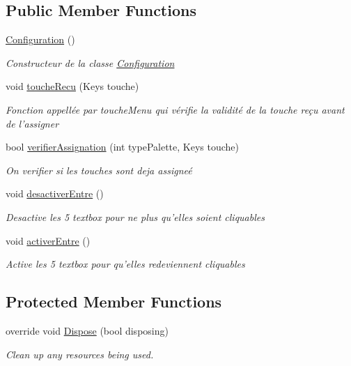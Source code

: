 \subsection*{Public Member Functions}
\begin{DoxyCompactItemize}
\item 
\hyperlink{class_interface_graphique_1_1_configuration_adb0bf51b9f3e30cfed923c7d9d950493}{Configuration} ()
\begin{DoxyCompactList}\small\item\em Constructeur de la classe \hyperlink{class_interface_graphique_1_1_configuration}{Configuration} \end{DoxyCompactList}\item 
void \hyperlink{class_interface_graphique_1_1_configuration_ab4745548932770c8563f537213665333}{touche\-Recu} (Keys touche)
\begin{DoxyCompactList}\small\item\em Fonction appellée par touche\-Menu qui vérifie la validité de la touche reçu avant de l'assigner \end{DoxyCompactList}\item 
bool \hyperlink{class_interface_graphique_1_1_configuration_ae446d3de8050f39b3a59c25cef3b0545}{verifier\-Assignation} (int type\-Palette, Keys touche)
\begin{DoxyCompactList}\small\item\em On verifier si les touches sont deja assigneé \end{DoxyCompactList}\item 
void \hyperlink{class_interface_graphique_1_1_configuration_a00f02e8ebc64ff4e6215fa4c84608fe3}{desactiver\-Entre} ()
\begin{DoxyCompactList}\small\item\em Desactive les 5 textbox pour ne plus qu'elles soient cliquables \end{DoxyCompactList}\item 
void \hyperlink{class_interface_graphique_1_1_configuration_aee709272d249a7f4d498befdc1f481ad}{activer\-Entre} ()
\begin{DoxyCompactList}\small\item\em Active les 5 textbox pour qu'elles redeviennent cliquables \end{DoxyCompactList}\end{DoxyCompactItemize}
\subsection*{Protected Member Functions}
\begin{DoxyCompactItemize}
\item 
override void \hyperlink{class_interface_graphique_1_1_configuration_a0200b084946b5710be7d94f9e8b0385c}{Dispose} (bool disposing)
\begin{DoxyCompactList}\small\item\em Clean up any resources being used. \end{DoxyCompactList}\end{DoxyCompactItemize}


